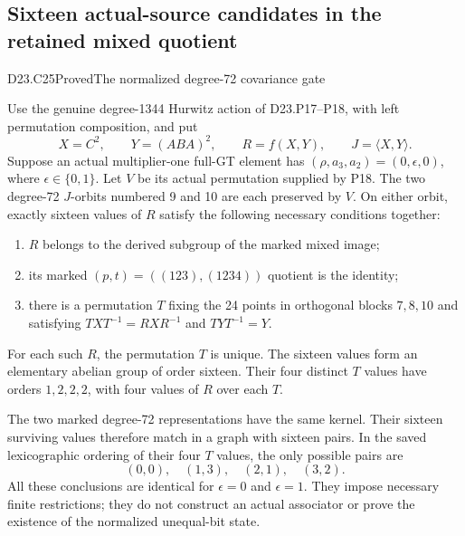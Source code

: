 \subsection{Sixteen actual-source candidates in the retained mixed quotient}

\begin{statement}{D23.C25}{Proved}{The normalized degree-72 covariance gate}
\end{statement}
Use the genuine degree-1344 Hurwitz action of D23.P17--P18, with
left permutation composition, and put
\[
 X=C^2,\qquad Y=(ABA)^2,\qquad R=f(X,Y),\qquad J=\langle X,Y\rangle.
\]
Suppose an actual multiplier-one full-GT element has
$(\rho,a_3,a_2)=(0,\epsilon,0)$, where $\epsilon\in\{0,1\}$.
Let $V$ be its actual permutation supplied by P18.  The two
degree-72 $J$-orbits numbered 9 and 10 are each preserved by $V$.
On either orbit, exactly sixteen values of $R$ satisfy the following
necessary conditions together:
\begin{enumerate}
\item $R$ belongs to the derived subgroup of the marked mixed image;
\item its marked $(p,t)=((123),(1234))$ quotient is the identity;
\item there is a permutation $T$ fixing the 24 points in orthogonal
      blocks $7,8,10$ and satisfying
      $TXT^{-1}=RXR^{-1}$ and $TYT^{-1}=Y$.
\end{enumerate}
For each such $R$, the permutation $T$ is unique.  The sixteen
values form an elementary abelian group of order sixteen.  Their
four distinct $T$ values have orders $1,2,2,2$, with four values
of $R$ over each $T$.

The two marked degree-72 representations have the same kernel.
Their sixteen surviving values therefore match in a graph with
sixteen pairs.  In the saved lexicographic ordering of their four
$T$ values, the only possible pairs are
\[
                   (0,0),\quad(1,3),\quad(2,1),\quad(3,2).
\]
All these conclusions are identical for $\epsilon=0$ and
$\epsilon=1$.  They impose necessary finite restrictions; they do
not construct an actual associator or prove the existence of the
normalized unequal-bit state.

